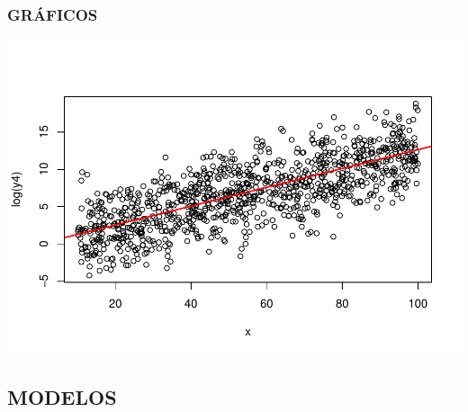 \documentclass[]{article}
\begin{document}
\subsubsection{GRÁFICOS}\label{graficos-4}

\includegraphics{Impacto_sigma_files/figure-latex/unnamed-chunk-16-1.pdf}

\subsection{MODELOS}\label{modelos}
\end{document}
